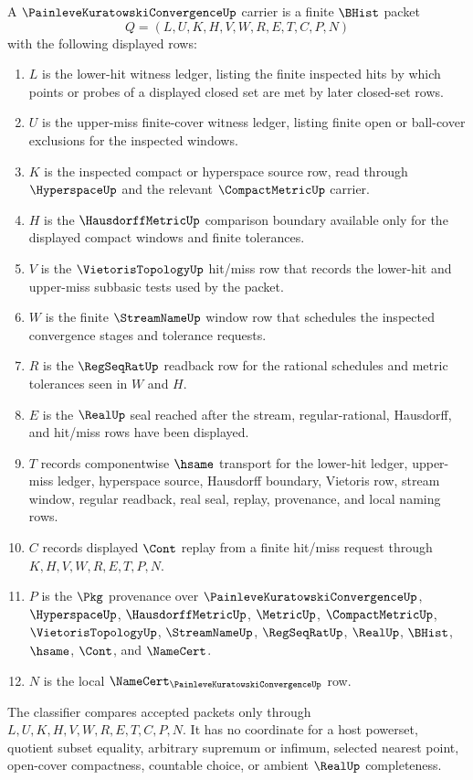 \begin{definition}
\label{def:painleve-kuratowski-convergence-carrier}
A $\PainleveKuratowskiConvergenceUp$ carrier is a finite $\BHist$ packet
$$
Q=(L,U,K,H,V,W,R,E,T,C,P,N)
$$
with the following displayed rows:
\begin{enumerate}
\item $L$ is the lower-hit witness ledger, listing the finite inspected hits by which points or probes of a displayed closed set are met by later closed-set rows.
\item $U$ is the upper-miss finite-cover witness ledger, listing finite open or ball-cover exclusions for the inspected windows.
\item $K$ is the inspected compact or hyperspace source row, read through $\HyperspaceUp$ and the relevant $\CompactMetricUp$ carrier.
\item $H$ is the $\HausdorffMetricUp$ comparison boundary available only for the displayed compact windows and finite tolerances.
\item $V$ is the $\VietorisTopologyUp$ hit/miss row that records the lower-hit and upper-miss subbasic tests used by the packet.
\item $W$ is the finite $\StreamNameUp$ window row that schedules the inspected convergence stages and tolerance requests.
\item $R$ is the $\RegSeqRatUp$ readback row for the rational schedules and metric tolerances seen in $W$ and $H$.
\item $E$ is the $\RealUp$ seal reached after the stream, regular-rational, Hausdorff, and hit/miss rows have been displayed.
\item $T$ records componentwise $\hsame$ transport for the lower-hit ledger, upper-miss ledger, hyperspace source, Hausdorff boundary, Vietoris row, stream window, regular readback, real seal, replay, provenance, and local naming rows.
\item $C$ records displayed $\Cont$ replay from a finite hit/miss request through $K,H,V,W,R,E,T,P,N$.
\item $P$ is the $\Pkg$ provenance over $\PainleveKuratowskiConvergenceUp$, $\HyperspaceUp$, $\HausdorffMetricUp$, $\MetricUp$, $\CompactMetricUp$, $\VietorisTopologyUp$, $\StreamNameUp$, $\RegSeqRatUp$, $\RealUp$, $\BHist$, $\hsame$, $\Cont$, and $\NameCert$.
\item $N$ is the local $\NameCert_{\PainleveKuratowskiConvergenceUp}$ row.
\end{enumerate}
The classifier compares accepted packets only through $L,U,K,H,V,W,R,E,T,C,P,N$. It has no coordinate for a host powerset, quotient subset equality, arbitrary supremum or infimum, selected nearest point, open-cover compactness, countable choice, or ambient $\RealUp$ completeness.
\end{definition}

